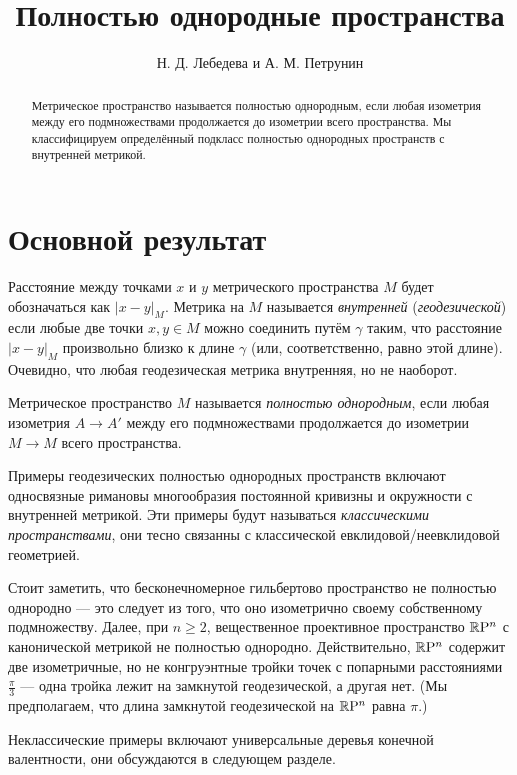 \documentclass[a4paper,10pt]{article}
\def\thetitle{Полностью однородные пространства}
\def\theauthors{Н. Д. Лебедева и А. М. Петрунин}
\begin{document}


\title{\thetitle}
\author{\theauthors}
\date{}
\maketitle

\begin{abstract}
Метрическое пространство называется полностью однородным, если любая изометрия между его подмножествами продолжается до изометрии всего пространства.
Мы классифицируем определённый подкласс полностью однородных пространств с внутренней метрикой.
\end{abstract}

\section{Основной результат}

Расстояние между точками $x$ и $y$ метрического пространства $M$ будет обозначаться как $|x-y|_M$.
Метрика на $M$ называется \emph{внутренней} (\emph{геодезической}) если любые две точки $x,y\in M$ можно соединить путём $\gamma$ таким, что расстояние $|x-y|_M$ произвольно близко к длине $\gamma$ (или, соответственно, равно этой длине).
Очевидно, что любая геодезическая метрика внутренняя, но не наоборот.

Метрическое пространство $M$ называется \emph{полностью однородным}, если любая изометрия $A\to A'$ между его подмножествами продолжается до изометрии $M\to M$ всего пространства.

Примеры геодезических полностью однородных пространств включают односвязные римановы многообразия постоянной кривизны и окружности с внутренней метрикой.
Эти примеры будут называться \emph{классическими пространствами},
они тесно связанны с классической евклидовой/неевклидовой геометрией.

Стоит заметить, что бесконечномерное гильбертово пространство не полностью однородно --- это следует из того, что оно изометрично своему собственному подмножеству.
Далее, при $n\ge2$, вещественное проективное пространство $\mathbb{R}\mathrm{P}^n$ с канонической метрикой не полностью однородно.
Действительно, $\mathbb{R}\mathrm{P}^n$ содержит две изометричные, но не конгруэнтные тройки точек с попарными расстояниями $\tfrac\pi3$ ---
одна тройка лежит на замкнутой геодезической, а другая нет. 
(Мы предполагаем, что длина замкнутой геодезической на $\mathbb{R}\mathrm{P}^n$ равна $\pi$.)

Неклассические примеры включают универсальные деревья конечной валентности, они обсуждаются в следующем разделе.
\end{document}
